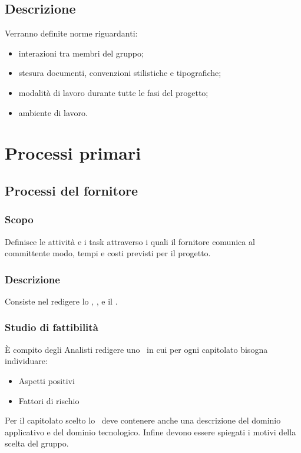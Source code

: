 \documentclass[12pt,a4paper]{article}
\begin{document}
\subsection{Descrizione}
Verranno definite norme riguardanti:
\begin{itemize}
	\item interazioni tra membri del gruppo;
	\item stesura documenti, convenzioni stilistiche e tipografiche;
	\item modalità di lavoro durante tutte le fasi del progetto;
	\item ambiente di lavoro.
\end{itemize}

\newpage

\section{Processi primari}

\subsection{Processi del fornitore}


\subsubsection{Scopo}
Definisce le attività e i task attraverso i quali il fornitore comunica al committente modo, tempi e costi previsti per il progetto.

\subsubsection{Descrizione}
Consiste nel redigere lo \SdF, \PdQ, e il \PdP.

\subsubsection{Studio di fattibilità}
È compito degli Analisti redigere uno \SdF\ in cui per ogni capitolato bisogna individuare:
\begin{itemize}
	\item Aspetti positivi
	\item Fattori di rischio
\end{itemize}
Per il capitolato scelto lo \SdF\ deve contenere anche una descrizione del dominio applicativo e del dominio tecnologico. Infine devono essere spiegati i motivi della scelta del gruppo.
\end{document}
